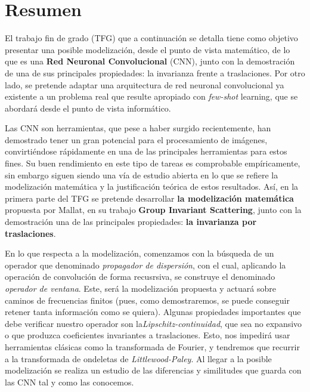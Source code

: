 %


\chapter{Resumen}

\noindent El trabajo fin de grado (TFG) que a continuación se detalla tiene como objetivo presentar una posible modelización, desde el punto de vista matemático, de lo que es una \textbf{Red Neuronal Convolucional} (CNN), junto con la demostración de una de sus principales propiedades: la invarianza frente a traslaciones. Por otro lado, se pretende adaptar una arquitectura de red neuronal convolucional ya existente a un problema real que resulte apropiado con \textit{few-shot} learning, que se abordará desde el punto de vista informático.

\medskip

\noindent Las CNN son herramientas, que pese a haber surgido recientemente, han demostrado tener un gran potencial para el procesamiento de imágenes, convirtiéndose rápidamente en una de las principales herramientas para estos fines. Su buen rendimiento en este tipo de tareas es comprobable empíricamente, sin embargo siguen siendo una vía de estudio abierta en lo que se refiere la modelización matemática y la justificación teórica de estos resultados. Así, en la primera parte del TFG se pretende desarrollar \textbf{la modelización matemática} propuesta por Mallat, en su trabajo \textbf{Group Invariant Scattering}, junto con la demostración una de las principales propiedades: \textbf{la invarianza por traslaciones}.

\medskip

\noindent En lo que respecta a la modelización, comenzamos con la búsqueda de un operador que denominado \textit{propagador de dispersión}, con el cual,  aplicando la operación de convolución de forma recusrsiva, se construye el denominado \textit{operador de ventana}. Este, será la modelización propuesta y actuará sobre caminos de frecuencias finitos (pues, como demostraremos, se puede conseguir retener tanta información como se quiera). Algunas propiedades importantes que debe verificar nuestro operador son la\textit{Lipschitz-continuidad}, que sea no expansivo o que produzca coeficientes invariantes a traslaciones. Esto, nos impedirá usar herramientas clásicas como la transformada de Fourier, y tendremos que recurrir a la transformada de ondeletas de \textit{Littlewood-Paley}. Al llegar a la posible modelización se realiza un estudio de las diferencias y similitudes que guarda con las CNN tal y como las conocemos.

